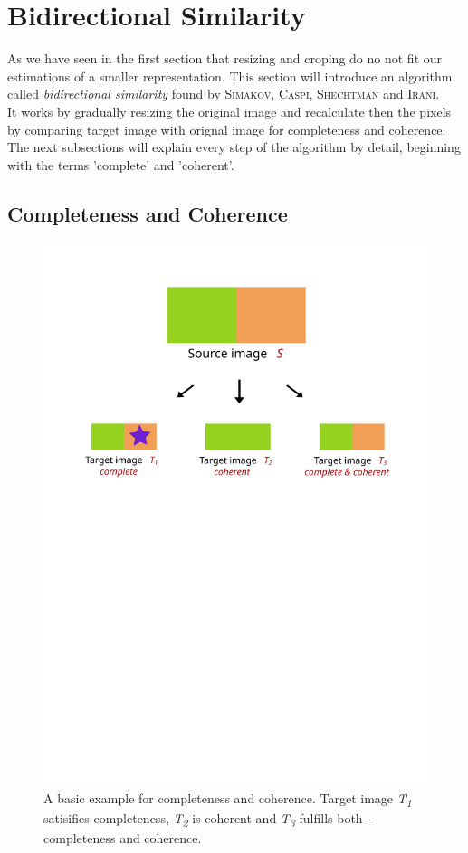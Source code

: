 \section{Bidirectional Similarity}
As we have seen in the first section that resizing and croping do no not fit our estimations of a smaller representation. This section will introduce an algorithm called \textit{bidirectional similarity} found by \textsc{Simakov, Caspi, Shechtman} and \textsc{Irani}.\\
It works by gradually resizing the original image and recalculate then the pixels by comparing target image with orignal image for completeness and coherence.\\
The next subsections will explain every step of the algorithm by detail, beginning with the terms 'complete' and 'coherent'.

\subsection{Completeness and Coherence}
\begin{figure}[h]
\centering
\includegraphics[scale=0.6]{img/cac}
\caption[Completeness and Coherence]{A basic example for completeness and coherence. Target image \textit{T\textsubscript{1}} satisifies completeness, \textit{T\textsubscript{2}} is coherent and \textit{T\textsubscript{3}} fulfills both - completeness and coherence.}
\label{fig:Completeness and Coherence}
\end{figure}

